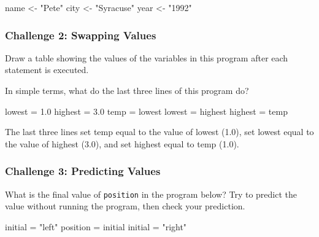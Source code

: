 \documentclass[]{book}
\newenvironment{Shaded}{\begin{snugshade}}{\end{snugshade}}
\newcommand{\FloatTok}[1]{\textcolor[rgb]{0.00,0.00,0.81}{#1}}
\newcommand{\StringTok}[1]{\textcolor[rgb]{0.31,0.60,0.02}{#1}}
\newcommand{\NormalTok}[1]{#1}
\begin{document}
\begin{Shaded}
\begin{Highlighting}[]
\NormalTok{name <-}\StringTok{ "Pete"}
\NormalTok{city <-}\StringTok{ "Syracuse"}
\NormalTok{year <-}\StringTok{ "1992"}
\end{Highlighting}
\end{Shaded}

\subsubsection*{Challenge 2: Swapping
Values}\label{challenge-2-swapping-values}

Draw a table showing the values of the variables in this program after
each statement is executed.

In simple terms, what do the last three lines of this program do?

\begin{Shaded}
\begin{Highlighting}[]
\NormalTok{lowest =}\StringTok{ }\FloatTok{1.0}
\NormalTok{highest =}\StringTok{ }\FloatTok{3.0}
\NormalTok{temp =}\StringTok{ }\NormalTok{lowest}
\NormalTok{lowest =}\StringTok{ }\NormalTok{highest}
\NormalTok{highest =}\StringTok{ }\NormalTok{temp}
\end{Highlighting}
\end{Shaded}

The last three lines set temp equal to the value of lowest (1.0), set
lowest equal to the value of highest (3.0), and set highest equal to
temp (1.0).

\subsubsection*{Challenge 3: Predicting
Values}\label{challenge-3-predicting-values}

What is the final value of \texttt{position} in the program below? Try
to predict the value without running the program, then check your
prediction.

\begin{Shaded}
\begin{Highlighting}[]
\NormalTok{initial =}\StringTok{ "left"}
\NormalTok{position =}\StringTok{ }\NormalTok{initial}
\NormalTok{initial =}\StringTok{ "right"}
\end{Highlighting}
\end{Shaded}
\end{document}
